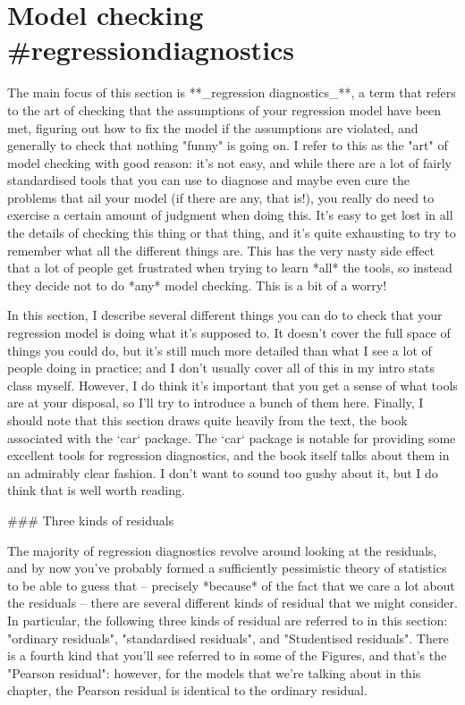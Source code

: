 \section{Model checking {#regressiondiagnostics}}

The main focus of this section is **_regression diagnostics_**, a term that refers to the art of checking that the assumptions of your regression model have been met, figuring out how to fix the model if the assumptions are violated, and generally to check that nothing "funny" is going on. I refer to this as the "art" of model checking with good reason: it's not easy, and while there are a lot of fairly standardised tools that you can use to diagnose and maybe even cure the problems that ail your model (if there are any, that is!), you really do need to exercise a certain amount of judgment when doing this. It's easy to get lost in all the details of checking this thing or that thing, and it's quite exhausting to try to remember what all the different things are. This has the very nasty side effect that a lot of people get frustrated when trying to learn *all* the tools, so instead they decide not to do *any* model checking. This is a bit of a worry! 

In this section, I describe several different things you can do to check that your regression model is doing what it's supposed to. It doesn't cover the full space of things you could do, but it's still much more detailed than what I see a lot of people doing in practice; and I don't usually cover all of this in my intro stats class myself. However, I do think it's important that you get a sense of what tools are at your disposal, so I'll try to introduce a bunch of them here. Finally, I should note that this section draws quite heavily from the  text, the book associated with the `car` package. The `car` package is notable for providing some excellent tools for regression diagnostics, and the book itself talks about them in an admirably clear fashion. I don't want to sound too gushy about it, but I do think that  is well worth reading.


### Three kinds of residuals

The majority of regression diagnostics revolve around looking at the residuals, and by now you've probably formed a sufficiently pessimistic theory of statistics to be able to guess that -- precisely *because* of the fact that we care a lot about the residuals -- there are several different kinds of  residual that we might consider. In particular, the following three kinds of residual are referred to in this section: "ordinary residuals", "standardised residuals", and "Studentised residuals". There is a fourth kind that you'll see referred to in some of the Figures, and that's the "Pearson residual": however, for the models that we're talking about in this chapter, the Pearson residual is identical to the ordinary residual. 

